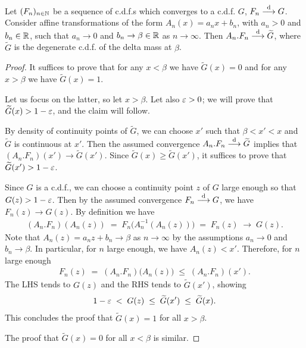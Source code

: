 \begin{lemma}
  \label{lem:degenerate-shrinking-limit}
  \leanok
  Let $(F_n)_{n \in \mathbb{N}}$ be a sequence of c.d.f.s which converges to a c.d.f. $G$,
  $F_n \overset{\mathrm{d}}{\longrightarrow} G$. Consider affine transformations of the form $A_n(x) = a_n x + b_n$,
  with $a_n > 0$ and $b_n \in \mathbb{R}$, such that $a_n \to 0$ and $b_n \to \beta \in \mathbb{R}$
  as $n \to \infty$. Then $A_n . F_n \overset{\mathrm{d}}{\longrightarrow} \widetilde{G}$, where
  $\widetilde{G}$ is the degenerate c.d.f. of the delta mass at $\beta$.
\end{lemma}
\begin{proof}
  It suffices to prove that for any $x < \beta$ we have $\widetilde{G}(x) = 0$
  and for any $x > \beta$ we have $\widetilde{G}(x) = 1$.

  Let us focus on the latter, so let $x > \beta$. Let also $\varepsilon > 0$; we will prove
  that $\widetilde{G}(x) > 1 - \varepsilon$, and the claim will follow.

  By density of continuity points of $\widetilde{G}$, we can choose $x'$ such that
  $\beta < x' < x$ and $\widetilde{G}$ is continuous at $x'$. Then the assumed
  convergence $A_n . F_n \overset{\mathrm{d}}{\longrightarrow} \widetilde{G}$ implies that
  $(A_n . F_n)(x') \to \widetilde{G}(x')$. Since $\widetilde{G}(x) \ge \widetilde{G}(x')$,
  it suffices to prove that $\widetilde{G}(x') > 1 - \varepsilon$.

  Since $G$ is a c.d.f., we can choose a continuity point $z$ of $G$
  large enough so that $G(z) > 1 - \varepsilon$.
  Then by the assumed convergence $F_n \overset{\mathrm{d}}{\longrightarrow} G$, we have
  $F_n(z) \to G(z)$. By definition we have
  \begin{align*}
    (A_n . F_n)(A_n(z)) \; = \; F_n \big( A_n^{-1} (A_n(z)) \big) \; = \; F_n(z)
      \; \longrightarrow \; G(z) . %
  \end{align*}
  Note that $A_n(z) = a_n z + b_n \to \beta$ as $n \to \infty$ by the assumptions
  $a_n \to 0$ and $b_n \to \beta$. In particular, for $n$ large enough,
  we have $A_n(z) < x'$.
  Therefore, for $n$ large enough
  \begin{align*}
    F_n(z) \; = \; (A_n . F_n) \big( A_n(z) \big) \; \le \; (A_n . F_n)(x') .
  \end{align*}
  The LHS tends to $G(z)$ and the RHS tends to $\widetilde{G}(x')$,
  showing
  \begin{align*}
    1 - \varepsilon \; < \; G(z) \; \le \; \widetilde{G}(x') \; \le \; \widetilde{G}(x) .
  \end{align*}
  This concludes the proof that $\widetilde{G}(x) = 1$ for all $x > \beta$.

  The proof that $\widetilde{G}(x) = 0$ for all $x < \beta$ is similar.
\end{proof}

